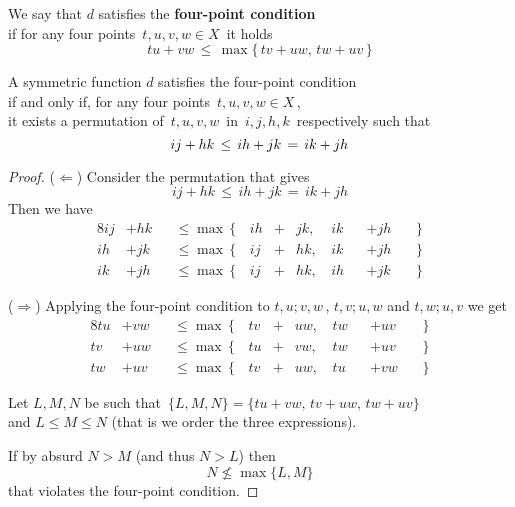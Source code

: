 \documentclass[./main.tex]{subfiles}
\begin{document}
\clearpage

\begin{definition}
    We say that $d$ satisfies the \textbf{four-point condition} \\
    \bsp if for any four points $\, t,u,v,w \in X \,$ it holds
    \[ tu + vw \,\leq\, \max {\{\, tv + uw,\, tw + uv \,\}} \]
\end{definition}

\begin{proposition}
    A symmetric function $d$ satisfies the four-point condition \\
    if and only if, for any four points $\, t,u,v,w \in X \,$, \\
    \bsp it exists a permutation of $\, t,u,v,w \,$ in $\, i,j,h,k \,$ respectively such that
    \[ ij + hk \,\leq\, ih + jk \,=\, ik + jh \nospblw \]
\end{proposition}
\begin{proof}
    ($\Leftarrow$) Consider the permutation that gives
    \[ ij + hk \,\leq\, ih + jk \,=\, ik + jh \]
    Then we have
    \begin{alignat*}{8}
        ij &+ hk &&\leq \max\, \{\,& ih &{}+{}& jk,\,{}& ik &&+ jh &&\,\} \\
        ih &+ jk &&\leq \max\, \{\,& ij &{}+{}& hk,\,{}& ik &&+ jh &&\,\} \\
        ik &+ jh &&\leq \max\, \{\,& ij &{}+{}& hk,\,{}& ih &&+ jk &&\,\}
    \end{alignat*} \smallskip

    ($\Rightarrow$) Applying the four-point condition to $t,u;v,w$\,, $t,v;u,w$ and $t,w;u,v$ we get
    \begin{alignat*}{8}
        tu &+ vw &&\leq \max\, \{\,& tv &{}+{}& uw,\,{}& tw &&+ uv &&\,\} \\
        tv &+ uw &&\leq \max\, \{\,& tu &{}+{}& vw,\,{}& tw &&+ uv &&\,\} \\
        tw &+ uv &&\leq \max\, \{\,& tv &{}+{}& uw,\,{}& tu &&+ vw &&\,\}
    \end{alignat*}

    Let $L,M,N$ be such that $\, \{L,M,N\} = \{tu + vw,\, tv + uw,\, tw + uv\} \,$ \\[1pt]
    \bsp and $L \leq M \leq N$ (that is we order the three expressions).
    
    If by absurd $N > M$ (and thus $N > L$) then
    \[ N \not\leq \max {\{L,M\}} \]
    that violates the four-point condition. \absurd
\end{proof}
\end{document}
